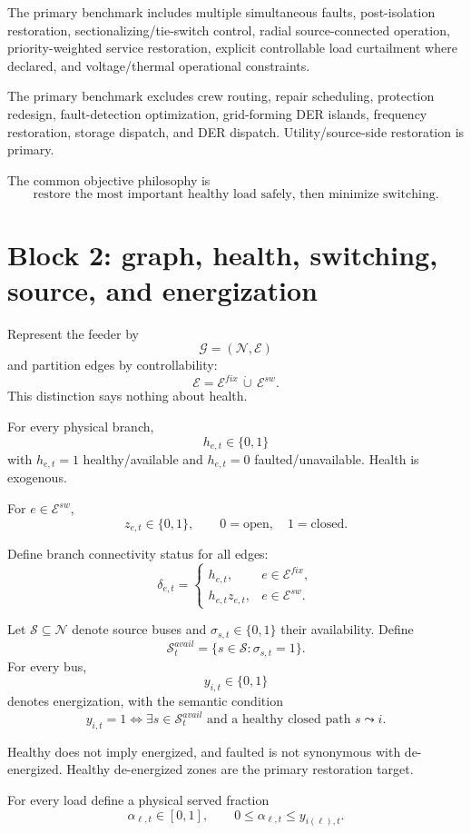 \documentclass[11pt]{article}
\begin{document}
The primary benchmark includes multiple simultaneous faults, post-isolation
restoration, sectionalizing/tie-switch control, radial source-connected operation,
priority-weighted service restoration, explicit controllable load curtailment where
declared, and voltage/thermal operational constraints.

The primary benchmark excludes crew routing, repair scheduling, protection redesign,
fault-detection optimization, grid-forming DER islands, frequency restoration,
storage dispatch, and DER dispatch. Utility/source-side restoration is primary.

The common objective philosophy is
\[
\boxed{\text{restore the most important healthy load safely, then minimize switching}.}
\]

\section{Block 2: graph, health, switching, source, and energization}
Represent the feeder by
\[
\boxed{\mathcal G=(\mathcal N,\mathcal E)}
\]
and partition edges by controllability:
\[
\boxed{\mathcal E=\mathcal E^{fix}\,\dot\cup\,\mathcal E^{sw}.}
\]
This distinction says nothing about health.

For every physical branch,
\[
\boxed{h_{e,t}\in\{0,1\}}
\]
with $h_{e,t}=1$ healthy/available and $h_{e,t}=0$ faulted/unavailable.
Health is exogenous.

For $e\in\mathcal E^{sw}$,
\[
\boxed{z_{e,t}\in\{0,1\},\qquad 0=\text{open},\quad 1=\text{closed}.}
\]

Define branch connectivity status for all edges:
\[
\boxed{
\delta_{e,t}=
\begin{cases}
h_{e,t}, & e\in\mathcal E^{fix},\\
h_{e,t}z_{e,t}, & e\in\mathcal E^{sw}.
\end{cases}}
\]

Let $\mathcal S\subseteq\mathcal N$ denote source buses and
$\sigma_{s,t}\in\{0,1\}$ their availability. Define
\[
\mathcal S_t^{avail}=\{s\in\mathcal S:\sigma_{s,t}=1\}.
\]
For every bus,
\[
\boxed{y_{i,t}\in\{0,1\}}
\]
denotes energization, with the semantic condition
\[
\boxed{
y_{i,t}=1
\iff
\exists s\in\mathcal S_t^{avail}\text{ and a healthy closed path }s\leadsto i.
}
\]

Healthy does not imply energized, and faulted is not synonymous with de-energized.
Healthy de-energized zones are the primary restoration target.

For every load define a physical served fraction
\[
\alpha_{\ell,t}\in[0,1],\qquad
\boxed{0\le\alpha_{\ell,t}\le y_{i(\ell),t}.}
\]
\end{document}
